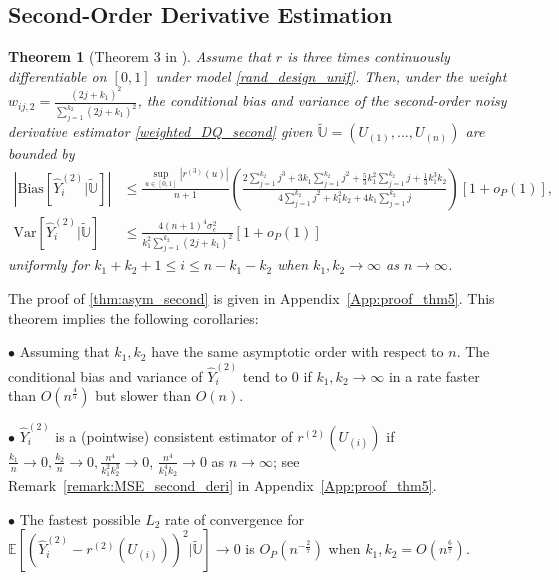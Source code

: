 \documentclass{uwstat572}
\newtheorem{theorem}{Theorem}
\theoremstyle{definition}
\renewcommand{\hat}{\widehat}
\renewcommand{\tilde}{\widetilde}
\theoremstyle{theorem}
\begin{document}
\subsection{Second-Order Derivative Estimation}

\begin{theorem}[Theorem 3 in \citealt{liu2020smoothed}]
\label{thm:asym_second}
Assume that $r$ is three times continuously differentiable on $[0,1]$ under model \eqref{rand_design_unif}. Then, under the weight $w_{ij,2}=\frac{(2j+k_1)^2}{\sum_{j=1}^{k_2} (2j+k_1)^2}$, the conditional bias and variance of the second-order noisy derivative estimator \eqref{weighted_DQ_second} given $\tilde{\mathbb{U}}=\left(U_{(1)},..., U_{(n)}\right)$ are bounded by
\begin{align*}
\left|\mathrm{Bias}\left[\hat{Y}_i^{(2)} \big| \tilde{\mathbb{U}}\right] \right| &\leq \frac{\sup_{u\in [0,1]}\left|r^{(3)}(u)\right|}{n+1}  \left(\frac{2\sum_{j=1}^{k_2} j^3 + 3k_1 \sum_{j=1}^{k_2} j^2 + \frac{5}{3} k_1^2 \sum_{j=1}^{k_2}j + \frac{1}{3} k_1^3k_2}{4 \sum_{j=1}^{k_2}j^2 + k_1^2k_2 + 4k_1\sum_{j=1}^{k_2} j} \right)\left[1+o_P(1)\right],\\
\mathrm{Var}\left[\hat{Y}_i^{(2)} \big| \tilde{\mathbb{U}}\right] &\leq \frac{4(n+1)^4 \sigma_e^2}{k_1^2 \sum_{j=1}^{k_2} (2j+k_1)^2} \left[1+o_P(1)\right]
\end{align*}
uniformly for $k_1+k_2+1 \leq i\leq n-k_1-k_2$ when $k_1,k_2\to \infty$ as $n\to\infty$.
\end{theorem}

\noindent The proof of \autoref{thm:asym_second} is given in Appendix~\ref{App:proof_thm5}. This theorem implies the following corollaries:
 
$\bullet$ Assuming that $k_1,k_2$ have the same asymptotic order with respect to $n$. The conditional bias and variance of $\hat{Y}_i^{(2)}$ tend to 0 if $k_1,k_2\to\infty$ in a rate faster than $O\left(n^{\frac{4}{5}} \right)$ but slower than $O(n)$.
	
$\bullet$ $\hat{Y}_i^{(2)}$ is a (pointwise) consistent estimator of $r^{(2)}(U_{(i)})$ if $\frac{k_1}{n} \to 0, \frac{k_2}{n} \to 0, \frac{n^4}{k_1^2k_2^3}\to 0$, $\frac{n^4}{k_1^4k_2} \to 0$ as $n\to\infty$; see Remark~\ref{remark:MSE_second_deri} in Appendix~\ref{App:proof_thm5}.
	
$\bullet$ The fastest possible $L_2$ rate of convergence for $\mathbb{E}\left[\left(\hat{Y}_i^{(2)} - r^{(2)}(U_{(i)})\right)^2 \big| \tilde{\mathbb{U}} \right] \to 0$ is $O_P\left(n^{-\frac{2}{7}}\right)$ when $k_1,k_2 = O\left(n^{\frac{6}{7}}\right)$.
\end{document}

